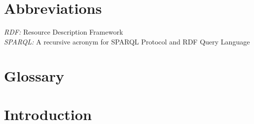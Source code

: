 \documentclass[12pt,a4paper]{article}
\begin{document}
\section*{Abbreviations}
\doublespacing
\textit{RDF:} Resource Description Framework\\
\textit{SPARQL:} A recursive acronym for SPARQL Protocol and RDF Query Language\\

\newpage
\section*{Glossary}
\label{sec:glossary}
\doublespacing













\newpage
\section{Introduction}
\label{sec:intro}






\end{document}
